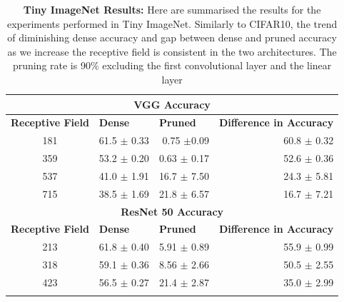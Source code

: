 \begin{table}[H]
  \centering
\begin{tabular}{crrr}\toprule
  \multicolumn{4}{c}{\textbf{VGG Accuracy}}                                                                                                                                                                          \\ \hline \multicolumn{1}{l}{\textbf{Receptive Field}}& \multicolumn{1}{l}{\textbf{Dense}}  & \multicolumn{1}{l}{\textbf{Pruned}}  & \multicolumn{1}{l}{\textbf{Difference in Accuracy}} \\
181& 61.5 $\pm$ 0.33& 0.75 $\pm$0.09 & 60.8 $\pm$ 0.32\\
359& 53.2 $\pm$ 0.20& 0.63 $\pm$ 0.17& 52.6 $\pm$ 0.36\\
537& 41.0 $\pm$ 1.91& 16.7 $\pm$ 7.50& 24.3 $\pm$ 5.81\\
715& 38.5 $\pm$ 1.69& 21.8 $\pm$ 6.57& 16.7 $\pm$ 7.21\\ \hline
\multicolumn{4}{c}{\textbf{ResNet 50 Accuracy}}                                                                                                                                                                    \\ \hline
\multicolumn{1}{l}{\textbf{Receptive Field}}& \multicolumn{1}{l}{\textbf{Dense}} & \multicolumn{1}{l}{\textbf{Pruned}}  & \multicolumn{1}{l}{\textbf{Difference in Accuracy}} \\
213                                         & 61.8 $\pm$ 0.40                                  & 5.91 $\pm$ 0.89                                    & 55.9 $\pm$ 0.99                                     \\
318                                         & 59.1 $\pm$ 0.36                                  & 8.56 $\pm$ 2.66                                    & 50.5 $\pm$ 2.55                                     \\
423                                         & 56.5 $\pm$ 0.27                                  & 21.4 $\pm$ 2.87                                     & 35.0 $\pm$ 2.99                                     \\ \hline\\
\end{tabular}\\
\caption{ \textbf{Tiny ImageNet Results:} Here are summarised the results for the experiments performed in Tiny ImageNet.
Similarly to CIFAR10, the trend of diminishing dense accuracy and gap between dense and pruned accuracy as we increase
the receptive field is consistent in the two architectures.
The pruning rate is 90\%  excluding the first convolutional layer and the linear layer}
\label{tab:tiny_imagenet_results}
\end{table}

